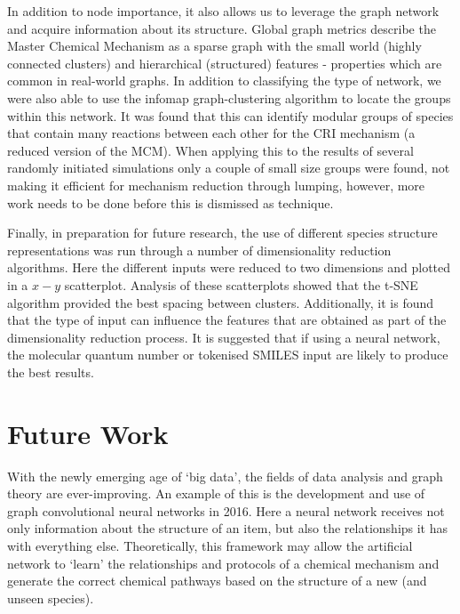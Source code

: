 In addition to node importance, it also allows us to leverage the graph network and acquire information about its structure. Global graph metrics describe the Master Chemical Mechanism as a sparse graph with the small world (highly connected clusters) and hierarchical (structured) features - properties which are common in real-world graphs. In addition to classifying the type of network, we were also able to use the infomap graph-clustering algorithm to locate the groups within this network. It was found that this can identify modular groups of species that contain many reactions between each other for the CRI mechanism (a reduced version of the MCM). When applying this to the results of several randomly initiated simulations only a couple of small size groups were found, not making it efficient for mechanism reduction through lumping, however, more work needs to be done before this is dismissed as technique.

Finally, in preparation for future research, the use of different species structure representations was run through a number of dimensionality reduction algorithms. Here the different inputs were reduced to two dimensions and plotted in a $x-y$ scatterplot. Analysis of these scatterplots showed that the t-SNE algorithm provided the best spacing between clusters. Additionally, it is found that the type of input can influence the features that are obtained as part of the dimensionality reduction process. It is suggested that if using a neural network, the molecular quantum number or tokenised SMILES input are likely to produce the best results.

\section{Future Work}
With the newly emerging age of `big data', the fields of data analysis and graph theory are ever-improving. An example of this is the development and use of graph convolutional neural networks in 2016. Here a neural network receives not only information about the structure of an item, but also the relationships it has with everything else. Theoretically, this framework may allow the artificial network to `learn' the relationships and protocols of a chemical mechanism and generate the correct chemical pathways based on the structure of a new (and unseen species).

